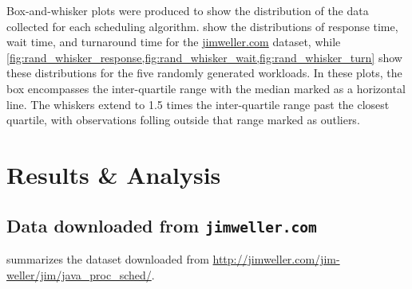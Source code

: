 \documentclass[12pt,letterpaper]{article}
\begin{document}
			Box-and-whisker plots were produced to show the distribution of the data collected for each scheduling algorithm.  show the distributions of response time, wait time, and turnaround time for the \url{jimweller.com} dataset, while \cref{fig:rand_whisker_response,fig:rand_whisker_wait,fig:rand_whisker_turn} show these distributions for the five randomly generated workloads. In these plots, the box encompasses the inter-quartile range with the median marked as a horizontal line. The whiskers extend to 1.5 times the inter-quartile range past the closest quartile, with observations folling outside that range marked as outliers.

  	\section{Results \& Analysis}

  		\subsection{Data downloaded from \texttt{jimweller.com}}

	  		 summarizes the dataset downloaded from \url{http://jimweller.com/jim-weller/jim/java_proc_sched/}.
\end{document}
